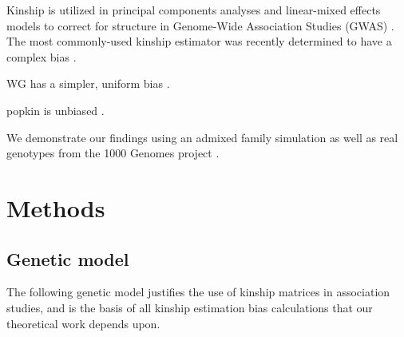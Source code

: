 \documentclass[11pt]{article}
\begin{document}
Kinship is utilized in principal components analyses and linear-mixed effects models to correct for structure in Genome-Wide Association Studies (GWAS) \citep{xie_combining_1998,yu_unified_2006, aulchenko_genomewide_2007, price_principal_2006, astle_population_2009,kang_efficient_2008, kang_variance_2010, yang_gcta:_2011, zhou_genome-wide_2012, yang_advantages_2014, loh_efficient_2015, sul_population_2018}.
The most commonly-used kinship estimator \citep{price_principal_2006, astle_population_2009, rakovski_kinship-based_2009, thornton_roadtrips:_2010, yang_common_2010, yang_gcta:_2011, zhou_genome-wide_2012, speed_improved_2012, yang_advantages_2014, speed_relatedness_2015, loh_efficient_2015, wang_efficient_2017, sul_population_2018} was recently determined to have a complex bias \citep{weir_unified_2017, ochoa_estimating_2021}.

WG has a simpler, uniform bias \citep{weir_unified_2017, ochoa_estimating_2021}.

popkin is unbiased  \citep{ochoa_estimating_2021}.

We demonstrate our findings using an admixed family simulation \citep{yao_limitations_2022} as well as real genotypes from the 1000 Genomes project \citep{the_1000_genomes_project_consortium_map_2010, 1000_genomes_project_consortium_integrated_2012, fairley_international_2020}.


\section{Methods}

\subsection{Genetic model}

The following genetic model justifies the use of kinship matrices in association studies, and is the basis of all kinship estimation bias calculations that our theoretical work depends upon.
\end{document}
